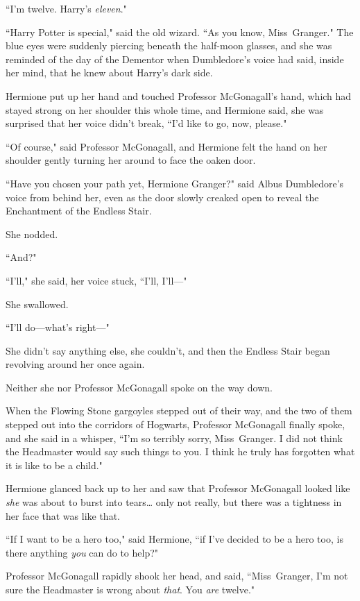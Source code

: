 ``I'm twelve. Harry's \emph{eleven}."

``Harry Potter is special," said the old wizard. ``As you know, Miss~Granger." The blue eyes were suddenly piercing beneath the half-moon glasses, and she was reminded of the day of the Dementor when Dumbledore's voice had said, inside her mind, that he knew about Harry's dark side.

Hermione put up her hand and touched Professor McGonagall's hand, which had stayed strong on her shoulder this whole time, and Hermione said, she was surprised that her voice didn't break, ``I'd like to go, now, please."

``Of course," said Professor McGonagall, and Hermione felt the hand on her shoulder gently turning her around to face the oaken door.

``Have you chosen your path yet, Hermione Granger?" said Albus Dumbledore's voice from behind her, even as the door slowly creaked open to reveal the Enchantment of the Endless Stair.

She nodded.

``And?"

``I'll," she said, her voice stuck, ``I'll, I'll---"

She swallowed.

``I'll do---what's right---"

She didn't say anything else, she couldn't, and then the Endless Stair began revolving around her once again.

Neither she nor Professor McGonagall spoke on the way down.

When the Flowing Stone gargoyles stepped out of their way, and the two of them stepped out into the corridors of Hogwarts, Professor McGonagall finally spoke, and she said in a whisper, ``I'm so terribly sorry, Miss~Granger. I did not think the Headmaster would say such things to you. I think he truly has forgotten what it is like to be a child."

Hermione glanced back up to her and saw that Professor McGonagall looked like \emph{she} was about to burst into tears{\ldots} only not really, but there was a tightness in her face that was like that.

``If I want to be a hero too," said Hermione, ``if I've decided to be a hero too, is there anything \emph{you} can do to help?"

Professor McGonagall rapidly shook her head, and said, ``Miss~Granger, I'm not sure the Headmaster is wrong about \emph{that}. You \emph{are} twelve."


